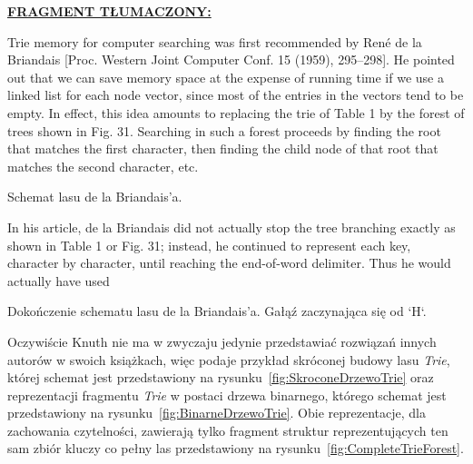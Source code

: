 	\ifsourcematerial	
	\begin{displayquote}
		\color{ao(english)}
		\underline{\textbf{FRAGMENT TŁUMACZONY:}} \newline
		
		Trie memory for computer searching was first recommended by René de la
		Briandais [Proc. Western Joint Computer Conf. 15 (1959), 295–298]. He pointed
		out that we can save memory space at the expense of running time if we use a
		linked list for each node vector, since most of the entries in the vectors tend to be
		empty. In effect, this idea amounts to replacing the trie of Table 1 by the forest of
		trees shown in Fig. 31. Searching in such a forest proceeds by finding the root
		that matches the first character, then finding the child node of that root that
		matches the second character, etc.
		
		\elide Schemat lasu de la Briandais'a. \elide
		
		In his article, de la Briandais did not actually stop the tree branching exactly
		as shown in Table 1 or Fig. 31; instead, he continued to represent each key,
		character by character, until reaching the end-of-word delimiter. Thus he would
		actually have used
		
		\elide Dokończenie schematu lasu de la Briandais'a. Gałąź zaczynająca się od `H`. \elide
		
	\end{displayquote}
	\fi
	
	Oczywiście Knuth nie ma w zwyczaju jedynie przedstawiać rozwiązań innych autorów w swoich książkach, więc podaje przykład skróconej budowy lasu \emph{Trie}, której schemat jest przedstawiony na rysunku~\ref{fig:SkroconeDrzewoTrie} oraz reprezentacji fragmentu \emph{Trie} w postaci drzewa binarnego, którego schemat jest przedstawiony na rysunku~\ref{fig:BinarneDrzewoTrie}. Obie reprezentacje, dla zachowania czytelności, zawierają tylko fragment struktur reprezentujących ten sam zbiór kluczy co pełny las przedstawiony na rysunku~\ref{fig:CompleteTrieForest}.
	
